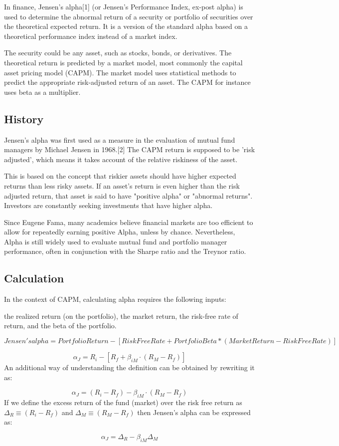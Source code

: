 In finance, Jensen's alpha[1] (or Jensen's Performance Index, ex-post alpha) is used to determine the abnormal return of a security or portfolio of securities over the theoretical expected return. It is a version of the standard alpha based on a theoretical performance index instead of a market index.

The security could be any asset, such as stocks, bonds, or derivatives. The theoretical return is predicted by a market model, most commonly the capital asset pricing model (CAPM). The market model uses statistical methods to predict the appropriate risk-adjusted return of an asset. The CAPM for instance uses beta as a multiplier.


\subsection{History}
Jensen's alpha was first used as a measure in the evaluation of mutual fund managers by Michael Jensen in 1968.[2] The CAPM return is supposed to be 'risk adjusted', which means it takes account of the relative riskiness of the asset.

This is based on the concept that riskier assets should have higher expected returns than less risky assets. If an asset's return is even higher than the risk adjusted return, that asset is said to have "positive alpha" or "abnormal returns". Investors are constantly seeking investments that have higher alpha.

Since Eugene Fama, many academics believe financial markets are too efficient to allow for repeatedly earning positive Alpha, unless by chance. Nevertheless, Alpha is still widely used to evaluate mutual fund and portfolio manager performance, often in conjunction with the Sharpe ratio and the Treynor ratio.

\subsection{Calculation}
In the context of CAPM, calculating alpha requires the following inputs:

the realized return (on the portfolio),
the market return,
the risk-free rate of return, and
the beta of the portfolio.

\[Jensen's alpha = Portfolio Return − [Risk Free Rate + Portfolio Beta * (Market Return − Risk Free Rate)]\]

\[{\displaystyle \alpha _{J}=R_{i}-[R_{f}+\beta _{iM}\cdot (R_{M}-R_{f})]} \]
An additional way of understanding the definition can be obtained by rewriting it as:

\[{\displaystyle \alpha _{J}=(R_{i}-R_{f})-\beta _{iM}\cdot (R_{M}-R_{f})}\]
If we define the excess return of the fund (market) over the risk free return as ${\displaystyle \Delta _{R}\equiv (R_{i}-R_{f})}$  and ${\displaystyle \Delta _{M}\equiv (R_{M}-R_{f})}$ then Jensen's alpha can be expressed as:

\[{\displaystyle \alpha _{J}=\Delta _{R}-\beta _{iM}\Delta _{M}}\]
